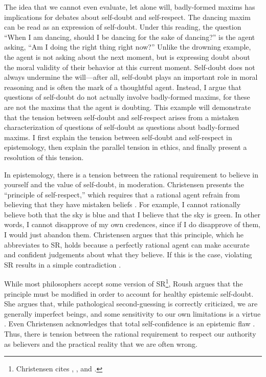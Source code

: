 \begin{isabellebody}
\begin{isamarkuptext}
The idea that we cannot even evaluate, let alone will, badly-formed maxims has implications for debates about 
self-doubt and self-respect. The dancing maxim can be read as an expression of self-doubt. Under this 
reading, the question ``When I am dancing, should I be dancing for the sake of dancing?'' is the agent asking, 
``Am I doing the right thing right now?'' Unlike the drowning example, the agent is not asking about the 
next moment, but is expressing doubt about the moral validity of their behavior at this current moment. 
Self-doubt does not always undermine the will—after all, self-doubt plays an 
important role in moral reasoning and is often the mark of a thoughtful agent. Instead, I argue 
that questions of self-doubt do not actually involve badly-formed maxims, for these are not the maxims 
that the agent is doubting. This example will demonstrate that the tension between self-doubt and self-respect 
arises from a mistaken characterization of questions of self-doubt as questions about badly-formed maxims.
I first explain the tension between self-doubt and self-respect in epistemology, then 
explain the parallel tension in ethics, and finally present a resolution of this tension.

In epistemology, there is a tension between the rational requirement to believe in yourself and the 
value of self-doubt, in moderation. Christensen presents the ``principle of self-respect,'' which requires 
that a rational agent refrain from believing that they have mistaken beliefs \cite[4]{christensen}. For example, I cannot 
rationally believe both that the sky is blue and that I believe that the sky is green. In other words, I cannot 
disapprove of my own credences, since if I do disapprove of them, I would just abandon them. Christensen 
argues that this principle, which he abbreviates to SR, holds because 
a perfectly rational agent can make accurate and confident judgements about what they believe. If this 
is the case, violating SR results in a simple contradiction \cite[8-9]{christensen}. 

While most philosophers accept some version of SR\footnote{Christensen cites \citet{vanfraasen}, 
\citet{vickers}, and \citet{koons}.}, 
Roush argues that the principle must be modified in order to account for healthy epistemic 
self-doubt. She argues that, while pathological second-guessing is correctly criticized, we are generally 
imperfect beings, and some sensitivity to our own limitations is a virtue \cite[2]{roushselfhelp}. Even Christensen 
acknowledges that total self-confidence is an epistemic flaw \cite[1]{christensen}. Thus, there is tension between the rational
requirement to respect our authority as believers and the practical reality that we are often wrong. 


\end{isamarkuptext}
\end{isabellebody}
